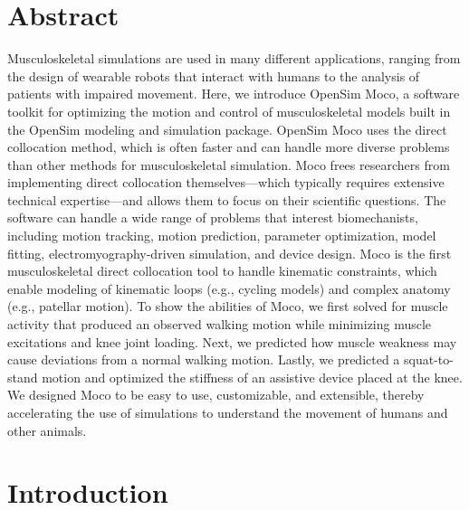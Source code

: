 \documentclass[10pt,letterpaper]{article}
\begin{document}
\section*{Abstract}
Musculoskeletal simulations are used in many different applications, ranging from the design of wearable robots that interact with humans to the analysis of patients with impaired movement. Here, we introduce OpenSim Moco, a software toolkit for optimizing the motion and control of musculoskeletal models built in the OpenSim modeling and simulation package. OpenSim Moco uses the direct collocation method, which is often faster and can handle more diverse problems than other methods for musculoskeletal simulation. Moco frees researchers from implementing direct collocation themselves---which typically requires extensive technical expertise---and allows them to focus on their scientific questions. The software can handle a wide range of problems that interest biomechanists, including motion tracking, motion prediction, parameter optimization, model fitting, electromyography-driven simulation, and device design. Moco is the first musculoskeletal direct collocation tool to handle kinematic constraints, which enable modeling of kinematic loops (e.g., cycling models) and complex anatomy (e.g., patellar motion). To show the abilities of Moco, we first solved for muscle activity that produced an observed walking motion while minimizing muscle excitations and knee joint loading. Next, we predicted how muscle weakness may cause deviations from a normal walking motion. Lastly, we predicted a squat-to-stand motion and optimized the stiffness of an assistive device placed at the knee. We designed Moco to be easy to use, customizable, and extensible, thereby accelerating the use of simulations to understand the movement of humans and other animals.



\linenumbers

\section*{Introduction}
\end{document}

